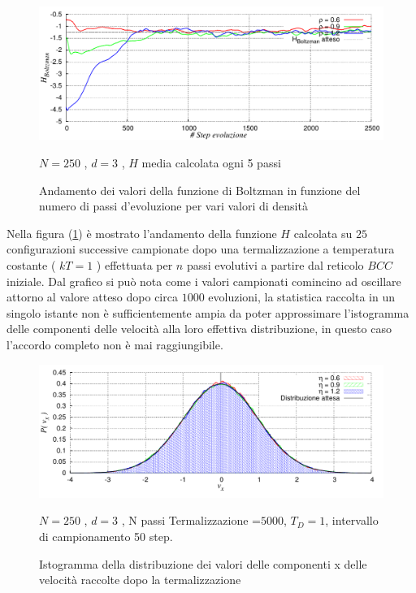 	\begin{figure}[!htbp]
		\centering
		\caption[Sfere Soffici$/$Preliminari\_Termalizzazione.cpp]{Andamento dei valori della funzione di Boltzman in funzione del numero di passi d'evoluzione per vari valori di densità}\label{fig: Termal H T_D Soffici}\vspace{-15pt}
		\includegraphics[scale=0.95]{Immagini/Soffici/Termal_HvsStep}

		\centering  \footnotesize{$N= 250$ , $d=3$ , $H$ media calcolata ogni 5 passi}
	\end{figure}
	
Nella figura (\ref{fig: Termal H T_D Soffici}) è mostrato l'andamento della funzione $H$ calcolata su $25$ configurazioni successive campionate dopo una termalizzazione a temperatura costante ( $kT=1$ ) effettuata per $n$ passi evolutivi a partire dal reticolo $BCC$ iniziale.
Dal grafico si può nota come i valori campionati comincino ad oscillare attorno al valore atteso dopo circa $1000$ evoluzioni, la statistica raccolta in un singolo istante non è sufficientemente ampia da poter approssimare l'istogramma delle componenti delle velocità alla loro effettiva distribuzione, in questo caso l'accordo completo non è mai raggiungibile.

	\begin{figure}[!htbp]
		\centering
		\caption[Sfere Soffici$/$Preliminari\_Termalizzazione.cpp]{Istogramma della distribuzione dei valori delle componenti x delle velocità raccolte dopo la termalizzazione}\label{fig: Termal Isto T_D Soffici}\vspace{-15pt}
		\includegraphics[scale=0.95]{Immagini/Soffici/DistroVx}

		\centering  \footnotesize{$N= 250$ , $d=3$ , N passi Termalizzazione =$ 5000$, $T_D=1$, intervallo di campionamento 50 step.}
	\end{figure}
	
